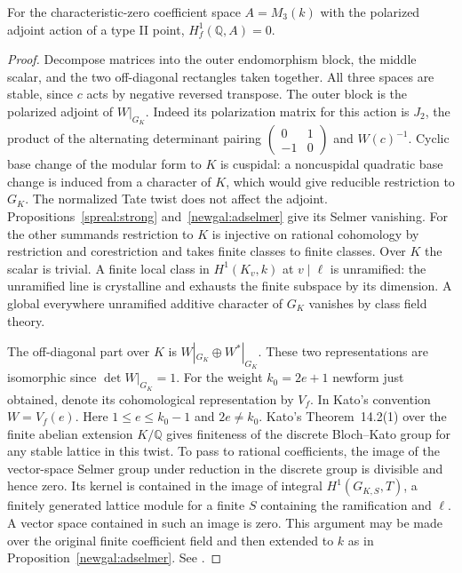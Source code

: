\begin{corollary}\label{spreal:endrig}
For the characteristic-zero coefficient space \(A=M_3(k)\) with
the polarized adjoint action of a type II point,
\(H^1_f(\mathbb Q,A)=0\).
\end{corollary}
\begin{proof}
Decompose matrices into the outer endomorphism block, the middle
scalar, and the two off-diagonal rectangles taken together. All
three spaces are stable, since \(c\) acts by negative reversed
transpose. The outer block is the polarized adjoint of \(W|_{G_K}\).
Indeed its polarization matrix for this action is \(J_2\), the
product of the alternating determinant pairing
\(\left(\begin{smallmatrix}0&1\\-1&0\end{smallmatrix}\right)\)
and \(W(c)^{-1}\). Cyclic base change of the modular form to \(K\)
is cuspidal: a noncuspidal quadratic base change is induced from a
character of \(K\), which would give reducible restriction to
\(G_K\). The normalized Tate twist does not affect the adjoint.
Propositions~\ref{spreal:strong} and~\ref{newgal:adselmer} give its
Selmer vanishing. For the other summands restriction to \(K\) is
injective on rational cohomology by restriction and corestriction
and takes finite classes to finite classes. Over \(K\) the scalar
is trivial. A finite local class in \(H^1(K_v,k)\) at \(v\mid\ell\)
is unramified: the unramified line is crystalline and exhausts the
finite subspace by its dimension. A global everywhere unramified
additive character of \(G_K\) vanishes by class field theory.

The off-diagonal part over \(K\) is \(W|_{G_K}\oplus W^*|_{G_K}\).
These two representations are isomorphic since \(\det W|_{G_K}=1\).
For the weight \(k_0=2e+1\) newform just obtained, denote its
cohomological representation by \(V_f\). In Kato's convention
\(W=V_f(e)\). Here \(1\le e\le k_0-1\) and \(2e\ne k_0\).
Kato's Theorem~14.2(1) over the finite abelian extension \(K/\mathbb Q\)
gives finiteness of the discrete Bloch--Kato group for any stable
lattice in this twist. To pass to rational coefficients, the image of
the vector-space Selmer group under reduction in the discrete group
is divisible and hence zero. Its kernel is contained in the image
of integral \(H^1(G_{K,S},T)\), a finitely generated lattice module
for a finite \(S\) containing the ramification and \(\ell\).
A vector space contained in such an image is zero. This argument
may be made over the original finite coefficient field and then
extended to \(k\) as in Proposition~\ref{newgal:adselmer}.
See \cite[\S14.1 and Theorem 14.2(1)]{katoZeta}.
\end{proof}

